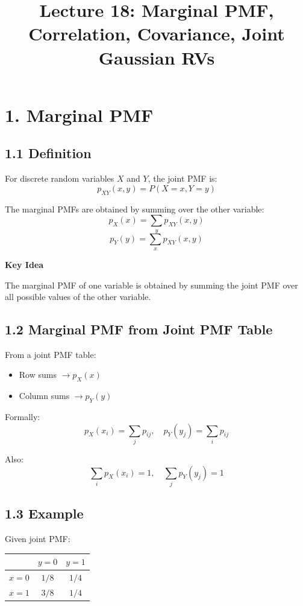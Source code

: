 \documentclass[12pt]{article}
\title{Lecture 18: Marginal PMF, Correlation, Covariance, Joint Gaussian RVs}
\author{}
\date{}
\begin{document}
\maketitle

\section*{1. Marginal PMF}

\subsection*{1.1 Definition}

For discrete random variables $X$ and $Y$, the joint PMF is:
\[
p_{XY}(x,y) = P(X = x, Y = y)
\]

The marginal PMFs are obtained by summing over the other variable:
\[
p_X(x) = \sum_y p_{XY}(x,y)
\]
\[
p_Y(y) = \sum_x p_{XY}(x,y)
\]

\textbf{Key Idea}

The marginal PMF of one variable is obtained by summing the joint PMF over all possible values of the other variable.

\subsection*{1.2 Marginal PMF from Joint PMF Table}

From a joint PMF table:
\begin{itemize}
    \item Row sums $\rightarrow p_X(x)$
    \item Column sums $\rightarrow p_Y(y)$
\end{itemize}

Formally:
\[
p_X(x_i) = \sum_j p_{ij}, \quad p_Y(y_j) = \sum_i p_{ij}
\]

Also:
\[
\sum_i p_X(x_i) = 1, \quad \sum_j p_Y(y_j) = 1
\]

\subsection*{1.3 Example}

Given joint PMF:

\begin{center}
\begin{tabular}{c|cc}
 & $y=0$ & $y=1$ \\
\hline
$x=0$ & $1/8$ & $1/4$ \\
$x=1$ & $3/8$ & $1/4$ \\
\end{tabular}
\end{center}
\end{document}
